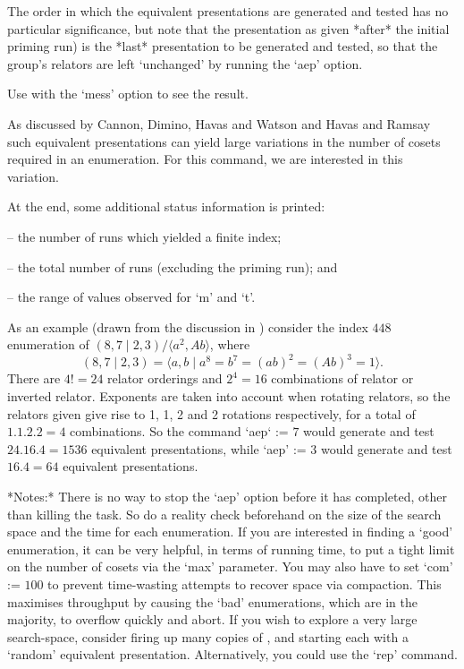 The  order in  which the  equivalent presentations  are  generated and
tested has no particular  significance, but note that the presentation
as  given *after*  the initial  priming  run) is  the *last*
presentation to be generated and  tested, so that the group's relators
are left `unchanged' by running the `aep' option.

Use  with  the  `mess' option  to  see  the  result. 

As discussed by Cannon, Dimino, Havas and Watson \cite{CDHW} and Havas
and Ramsay  \cite{HR1} such  equivalent presentations can  yield large
variations in  the number of  cosets required in an  enumeration.  For
this command, we are interested in this variation.

At the end, some additional status information is printed: 


\beginlist
\item{--}  the number of runs which yielded a finite index; 
\item{--}  the total number of runs (excluding the priming run); and 
\item{--}  the range of values observed for `m' and `t'.
\endlist


As an example (drawn from the discussion in \cite{HR1}) consider the index
  $448$ enumeration of $(8,7 \mid 2,3) / \langle a^2,Ab \rangle$,
  where $$ (8,7 \mid 2,3) 
    = \langle a,b \mid a^8 = b^7 = (ab)^2 = (Ab)^3 = 1 \rangle . $$
There are $4!=24$ relator orderings and $2^4=16$ combinations of relator or
inverted relator.
Exponents are taken into account when rotating relators, so the relators
given give rise to 1, 1, 2 and 2 rotations respectively, for a total
of $1.1.2.2=4$ combinations.
So the command `aep` := $7$ would generate and test $24.16.4=1536$ 
equivalent presentations, while `aep' := $3$ would generate and test 
$16.4=64$ equivalent presentations.

*Notes:*
There is  no way  to stop  the `aep' option  before it  has completed,
other than killing the task.  So  do a reality check beforehand on the
size of  the search space and  the time for each  enumeration.  If you
are  interested  in finding  a  `good'  enumeration,  it can  be  very
helpful, in terms of running time,  to put a tight limit on the number
of cosets via the `max' parameter.
You may also have to set `com' := $100$ to prevent time-wasting attempts
to recover space via compaction.
This maximises throughput by causing the `bad' enumerations, which are in
the majority, to overflow quickly and abort.
If you wish to explore a very large search-space, consider firing up many
copies of {\ACE}, and starting each with a `random' equivalent
presentation.
Alternatively, you could use the `rep' command.

